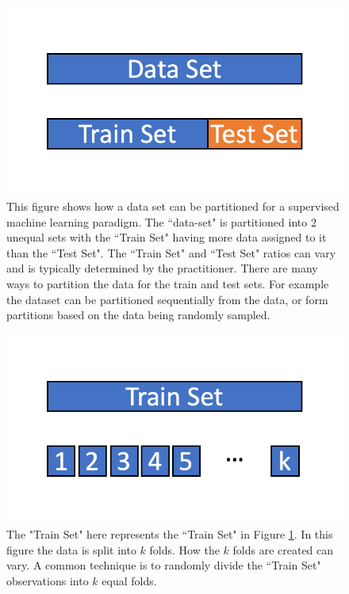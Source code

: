 \begin{figure}[!htb]
    \centering
      \centering
      \includegraphics[width=\textwidth]{figures/ppt/TrainTestSplit.png}
    \caption{
      This figure shows how a data set can be partitioned for a supervised machine learning paradigm. The ``data-set" is partitioned into 2 unequal sets with the ``Train Set" having more data assigned to it than the ``Test Set".  The ``Train Set" and ``Test Set" ratios can vary and is typically determined by the practitioner. There are many ways to partition the data for the train and test sets. For example the dataset can be partitioned sequentially from the data, or form partitions based on the data being randomly sampled.
      }
\label{fig:TrainTestSplit}

  \end{figure}


\begin{figure}[!htb]
    \centering
      \centering
      \includegraphics[width=\textwidth]{figures/ppt/KFoldValidation.png}
    \caption{
	The "Train Set" here represents the ``Train Set" in Figure \ref{fig:TrainTestSplit}. In this figure the data is split into \(k\) folds. How the \(k\) folds are created can vary. A common technique is to randomly divide the ``Train Set" observations into \(k\) equal folds.
      }
     \label{fig:KFoldValidation}
  \end{figure}

